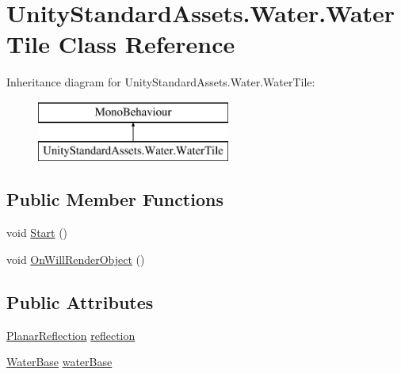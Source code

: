 \hypertarget{class_unity_standard_assets_1_1_water_1_1_water_tile}{}\section{Unity\+Standard\+Assets.\+Water.\+Water\+Tile Class Reference}
\label{class_unity_standard_assets_1_1_water_1_1_water_tile}
Inheritance diagram for Unity\+Standard\+Assets.\+Water.\+Water\+Tile\+:\begin{figure}[H]
\begin{center}
\leavevmode
\includegraphics[height=2.000000cm]{class_unity_standard_assets_1_1_water_1_1_water_tile}
\end{center}
\end{figure}
\subsection*{Public Member Functions}
\begin{DoxyCompactItemize}
\item 
void \mbox{\hyperlink{class_unity_standard_assets_1_1_water_1_1_water_tile_a9dcac1ce9deb6f36c873828971f4c418}{Start}} ()
\item 
void \mbox{\hyperlink{class_unity_standard_assets_1_1_water_1_1_water_tile_a4afbc3cc313c5b28f14ff2af72657c40}{On\+Will\+Render\+Object}} ()
\end{DoxyCompactItemize}
\subsection*{Public Attributes}
\begin{DoxyCompactItemize}
\item 
\mbox{\hyperlink{class_unity_standard_assets_1_1_water_1_1_planar_reflection}{Planar\+Reflection}} \mbox{\hyperlink{class_unity_standard_assets_1_1_water_1_1_water_tile_afbbdc233e3c3eb9bdb994cd649761f5d}{reflection}}
\item 
\mbox{\hyperlink{class_unity_standard_assets_1_1_water_1_1_water_base}{Water\+Base}} \mbox{\hyperlink{class_unity_standard_assets_1_1_water_1_1_water_tile_a67837989d45fc4836b938f8899a35bb3}{water\+Base}}
\end{DoxyCompactItemize}


